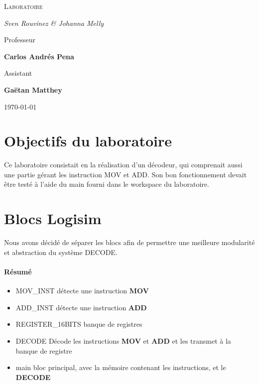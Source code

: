 \documentclass[a4paper]{article} %
\begin{document}
\renewcommand{\labelitemi}{$\bullet$}
\renewcommand{\labelitemii}{$\cdot$}
\renewcommand{\labelitemiii}{$\diamond$}
\renewcommand{\labelitemiv}{$\ast$}

\begin{titlepage}
	\centering
	
	{\scshape\LARGE \color{Monokaimagenta} Laboratoire \\  \par}
	
	\vspace{1cm}
	
	{\Large\itshape Sven Rouvinez \& Johanna Melly\par}
	
	\vfill
	Professeur\par
	\textbf{Carlos Andrés Pena} \par%
	\vspace{1cm}
	Assistant\par
	\textbf{Gaëtan Matthey}
	
	\vfill

	{\large \today\par}
	
\end{titlepage}

\section{Objectifs du laboratoire}
Ce laboratoire consistait en la réalisation d'un décodeur, qui comprenait aussi une partie gérant les instruction MOV et ADD. Son bon fonctionnement devait être testé à l'aide du main fourni dans le workspace du laboratoire.

\section{Blocs Logisim}
Nous avons décidé de séparer les blocs afin de permettre une meilleure modularité et abstraction du système DECODE.\\
\paragraph{Résumé}
\begin{itemize}
    \item     MOV\_INST détecte une instruction \textbf{MOV}
    \item     ADD\_INST détecte une instruction \textbf{ADD}
    \item     REGISTER\_16BITS banque de registres
    \item     DECODE Décode les instructions \textbf{MOV} et \textbf{ADD} et les transmet à la banque de registre
    \item     main bloc principal, avec la mémoire contenant les instructions, et le \textbf{DECODE}
\end{itemize}
\end{document}
